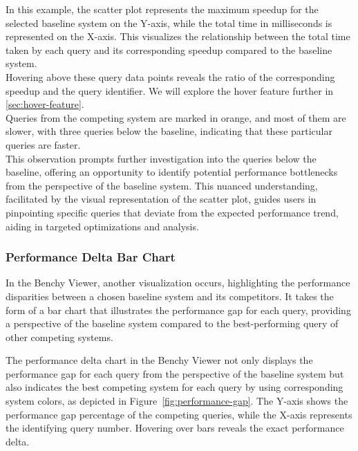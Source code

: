 In this example, the scatter plot represents the maximum speedup for the selected baseline system on the Y-axis, while the total time in milliseconds is represented on the X-axis. This visualizes the relationship between the total time taken by each query and its corresponding speedup compared to the baseline system.\\
Hovering above these query data points reveals the ratio of the corresponding speedup and the query identifier. We will explore the hover feature further in \ref{sec:hover-feature}.\\
Queries from the competing system are marked in orange, and most of them are slower, with three queries below the baseline, indicating that these particular queries are faster.\\
This observation prompts further investigation into the queries below the baseline, offering an opportunity to identify potential performance bottlenecks from the perspective of the baseline system. This nuanced understanding, facilitated by the visual representation of the scatter plot, guides users in pinpointing specific queries that deviate from the expected performance trend, aiding in targeted optimizations and analysis.


\subsubsection{Performance Delta Bar Chart}

In the Benchy Viewer, another visualization occurs, highlighting the performance disparities between a chosen baseline system and its competitors. It takes the form of a bar chart that illustrates the performance gap for each query, providing a perspective of the baseline system compared to the best-performing query of other competing systems.

The performance delta chart in the Benchy Viewer not only displays the performance gap for each query from the perspective of the baseline system but also indicates the best competing system for each query by using corresponding system colors, as depicted in Figure~\ref{fig:performance-gap}. The Y-axis shows the performance gap percentage of the competing queries, while the X-axis represents the identifying query number. Hovering over bars reveals the exact performance delta.

